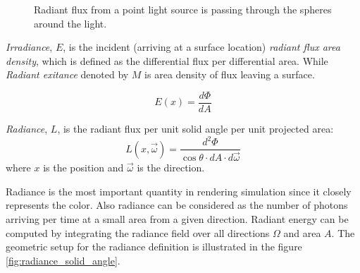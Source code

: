 \begin{figure}[htp]
    \centering
    \renewcommand{\thefigure}{\thechapter.\arabic{figure}}
    \caption[Radiant flux of point light source]{Radiant flux from a point light source is passing through the spheres around the light.}
    \label{fig:flux_point_light}
\end{figure}

\emph{Irradiance}, \(E\), is the incident (arriving at a surface location) \emph{radiant flux area density}, which is defined as the differential flux per differential area. While \emph{Radiant exitance} denoted by \(M\) is area density of flux leaving a surface.

\begin{equation}
E(x) = \frac{d\Phi}{dA}
\end{equation}

\emph{Radiance}, \(L\), is the radiant flux per unit solid angle per unit projected area:
\begin{equation}
L(x, \overrightarrow{\omega}) = \frac{d^{2}\Phi}{\cos{\theta} \cdot dA \cdot d\overrightarrow{\omega}}
\end{equation}
where \(x\) is the position and \(\overrightarrow{\omega}\) is the direction.

Radiance is the most important quantity in rendering simulation since it closely represents the color. Also radiance can be considered as the number of photons arriving per time at a small area from a given direction. Radiant energy can be computed by integrating the radiance field over all directions \(\Omega\) and area \(A\). The geometric setup for the radiance definition is illustrated in the figure \ref{fig:radiance_solid_angle}. 

